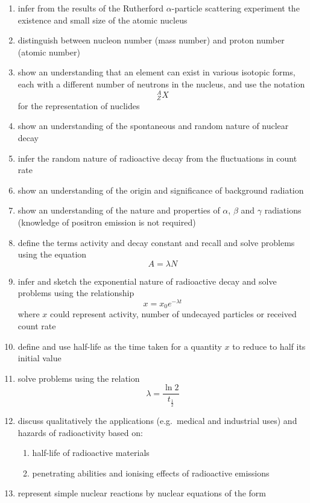 \documentclass[a4paper]{article}
\begin{document}
\begin{enumerate}[label=(\alph*)]
    \item infer from the results of the Rutherford $\alpha$-particle scattering experiment the existence and small size of the atomic nucleus
    \item distinguish between nucleon number (mass number) and proton number (atomic number)
    \item show an understanding that an element can exist in various isotopic forms, each with a different number of neutrons in the nucleus, and use the notation
    \[
        {}^{A}_{Z}X
    \]
    for the representation of nuclides
    \item show an understanding of the spontaneous and random nature of nuclear decay
    \item infer the random nature of radioactive decay from the fluctuations in count rate
    \item show an understanding of the origin and significance of background radiation
    \item show an understanding of the nature and properties of $\alpha$, $\beta$ and $\gamma$ radiations (knowledge of positron emission is not required)
    \item define the terms activity and decay constant and recall and solve problems using the equation
    \[
        A = \lambda N
    \]
    \item infer and sketch the exponential nature of radioactive decay and solve problems using the relationship
    \[
        x = x_0 e^{-\lambda t}
    \]
    where $x$ could represent activity, number of undecayed particles or received count rate
    \item define and use half-life as the time taken for a quantity $x$ to reduce to half its initial value
    \item solve problems using the relation
    \[
        \lambda = \frac{\ln 2}{t_{\frac{1}{2}}}
    \]
    \item discuss qualitatively the applications (e.g.\ medical and industrial uses) and hazards of radioactivity based on:
    \begin{enumerate}[label=(\roman*)]
        \item half-life of radioactive materials
        \item penetrating abilities and ionising effects of radioactive emissions
    \end{enumerate}
    \item represent simple nuclear reactions by nuclear equations of the form

\end{enumerate}
\end{document}
